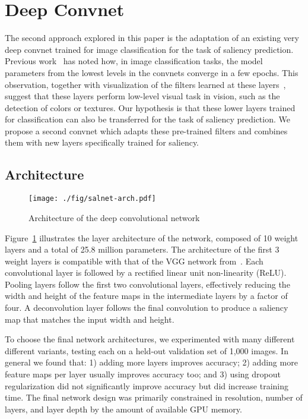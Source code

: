 \documentclass[10pt,twocolumn,letterpaper]{article}
\begin{document}
\section{Deep Convnet}\label{sec:SalNet}

The second approach explored in this paper is the adaptation of an existing very deep convnet trained for image classification for the task of saliency prediction.
Previous work~\cite{zeiler2014visualizing} has noted how, in image classification tasks, the model parameters from the lowest levels in the convnets converge in a few epochs.
This observation, together with visualization of the filters learned at these layers~\cite{simonyan2013deep}, suggest that these layers perform low-level visual task in vision, such as the detection of colors or textures.
Our hypothesis is that these lower layers trained for classification can also be transferred for the task of saliency prediction.
We propose a second convnet which adapts these pre-trained filters and combines them with new layers specifically trained for saliency.

\subsection{Architecture}\begin{figure}
	\centering
	\texttt{[image: ./fig/salnet-arch.pdf]}
	\caption{Architecture of the deep convolutional network}
	\label{fig:salnet-arch}
\end{figure}

Figure~\ref{fig:salnet-arch} illustrates the layer architecture of the network, composed of 10 weight layers and a total of 25.8 million parameters.
The architecture of the first 3 weight layers is compatible with that of the VGG network from~\cite{chatfield2014devil}. Each convolutional layer is followed by a rectified linear unit non-linearity (ReLU). Pooling layers follow the first two convolutional layers, effectively reducing the width and height of the feature maps in the intermediate layers by a factor of four. A deconvolution layer follows the final convolution to produce a saliency map that matches the input width and height.



To choose the final network architectures, we experimented with many different different variants, testing each on a held-out validation set of 1,000 images. In general we found that: 1) adding more layers improves accuracy; 2) adding more feature maps per layer usually improves accuracy too; and 3) using dropout regularization did not significantly improve accuracy but did increase training time. The final network design was primarily constrained in resolution, number of layers, and layer depth by the amount of available GPU memory.
\end{document}
